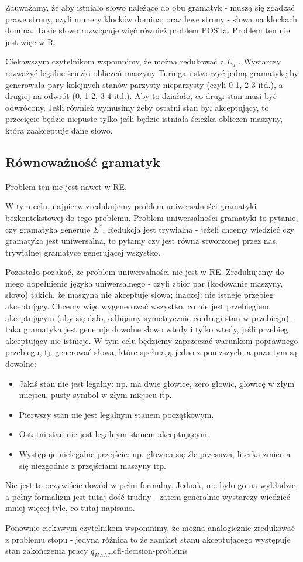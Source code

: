 Zauważamy, że aby istniało słowo należące do obu gramatyk - muszą się zgadzać prawe strony, czyli numery klocków domina; oraz lewe strony - słowa na klockach domina. Takie słowo rozwiącuje więć również problem POSTa. Problem ten nie jest więc w R.

Ciekawszym czytelnikom wspomnimy, że można redukować z \( L_u \) . Wystarczy rozważyć legalne ścieżki obliczeń maszyny Turinga i stworzyć jedną gramatykę by generowała pary kolejnych stanów parzysty-nieparzysty (czyli 0-1, 2-3 itd.), a drugiej na odwrót (0, 1-2, 3-4 itd.). Aby to działało, co drugi stan musi być odwrócony. Jeśli również wymusimy żeby ostatni stan był akceptujący, to przecięcie będzie niepuste tylko jeśli będzie istniała ścieżka obliczeń maszyny, która zaakceptuje dane słowo.

\subsection{Równoważność gramatyk}

Problem ten nie jest nawet w RE.

W tym celu, najpierw zredukujemy problem uniwersalności gramatyki bezkontekstowej do tego problemu. Problem uniwersalności gramatyki to pytanie, czy gramatyka generuje \( \Sigma^* \). Redukcja jest trywialna - jeżeli chcemy wiedzieć czy gramatyka jest uniwersalna, to pytamy czy jest równa stworzonej przez nas, trywialnej gramatyce generującej wszystko.

Pozostało pozakać, że problem uniwersalności nie jest w RE. Zredukujemy do niego dopełnienie języka uniwersalnego - czyli zbiór par (kodowanie maszyny, słowo) takich, że maszyna nie akceptuje słowa; inaczej: nie istneje przebieg akceptujący. Chcemy więc wygenerować wszystko, co nie jest przebiegiem akceptującym (aby się dało, odbijamy symetrycznie co drugi stan w przebiegu) - taka gramatyka jest generuje dowolne słowo wtedy i tylko wtedy, jeśli przebieg akceptujący nie istnieje. W tym celu będziemy zaprzeczać warunkom poprawnego przebiegu, tj. generować słowa, które spełniają jedno z poniższych, a poza tym są dowolne:

\begin{itemize}
	\item Jakiś stan nie jest legalny: np. ma dwie głowice, zero głowic, głowicę w złym miejscu, pusty symbol w złym miejscu itp.
	\item Pierwszy stan nie jest legalnym stanem początkowym.
	\item Ostatni stan nie jest legalnym stanem akceptującym.
	\item Występuje nielegalne przejście: np. głowica się źle przesuwa, literka zmienia się niezgodnie z przejściami maszyny itp.
\end{itemize}

Nie jest to oczywiście dowód w pełni formalny. Jednak, nie było go na wykładzie, a pełny formalizm jest tutaj dość trudny - zatem generalnie wystarczy wiedzieć mniej więcej tyle, co tutaj napisano.

Ponownie ciekawym czytelnikom wspomnimy, że można analogicznie zredukować z problemu stopu - jedyna różnica to że zamiast stanu akceptującego występuje stan zakończenia pracy \( q_{HALT} \).cfl-decision-problems